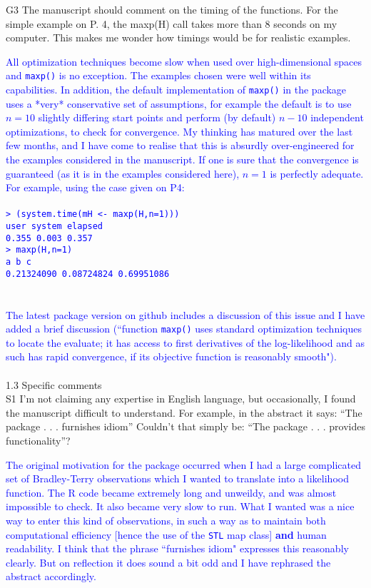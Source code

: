 \documentclass[12pt]{article}
\begin{document}
G3 The manuscript should comment on the timing of the functions. For the
simple example on P. 4, the maxp(H) call takes more than 8 seconds on
my computer. This makes me wonder how timings would be for realistic
examples.

\textcolor{blue}{All optimization techniques become slow when used
  over high-dimensional spaces and {\tt maxp()} is no exception.  The
  examples chosen were well within its capabilities.  In addition, the
  default implementation of {\tt maxp()} in the package uses a *very*
  conservative set of assumptions, for example the default is to use
  $n=10$ slightly differing start points and perform (by default)
  $n-10$ independent optimizations, to check for convergence.  My
  thinking has matured over the last few months, and I have come to
  realise that this is absurdly over-engineered for the examples
  considered in the manuscript.  If one is sure that the convergence
  is guaranteed (as it is in the examples considered here), $n=1$ is
  perfectly adequate.  For example, using the case given on P4:
  {\tt\\ \\
> (system.time(mH <- maxp(H,n=1)))\\
   user  system elapsed \\
  0.355   0.003   0.357 \\
> maxp(H,n=1)\\
         a          b          c \\
0.21324090 0.08724824 0.69951086 \\
  }\\ \\
  The latest package version on github includes a discussion of this
  issue and I have added a brief discussion (``function {\tt maxp()}
  uses standard optimization techniques to locate the evaluate; it has
  access to first derivatives of the log-likelihood and as such has
  rapid convergence, if its objective function is reasonably
  smooth").}\\ \\


1.3 Specific comments\\ S1 I'm not claiming any expertise in English
language, but occasionally, I found the manuscript difficult to
understand. For example, in the abstract it says: ``The package
. . . furnishes idiom'' Couldn't that simply be: ``The package
. . . provides functionality''?

\textcolor{blue}{The original motivation for the package occurred when
  I had a large complicated set of Bradley-Terry observations which I
  wanted to translate into a likelihood function.  The R code became
  extremely long and unweildy, and was almost impossible to check.  It
  also became very slow to run.  What I wanted was a nice way to enter
  this kind of observations, in such a way as to maintain both
  computational efficiency [hence the use of the {\tt STL} map class]
  {\bf and} human readability.  I think that the phrase ``furnishes
  idiom" expresses this reasonably clearly.  But on reflection it does
  sound a bit odd and I have rephrased the abstract accordingly.}\\ \\
\end{document}
